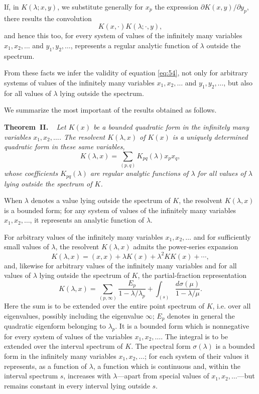 \documentclass[b5paper,twoside]{article}
\makeatletter
\newcommand{\hilbertstatementname}[2]{%
  \textbf{#1\if\relax\detokenize{#2}\relax\else\ #2\fi.}%
}
\newenvironment{theorem}[1][]{%
  \par\addvspace{.7\baselineskip}%
  \phantomsection
  \protected@edef\@currentlabel{#1}%
  \noindent\hilbertstatementname{Theorem}{#1}\ \itshape\ignorespaces
}{%
  \par\addvspace{.7\baselineskip}%
}
\newcommand{\originalpage}[1]{\phantomsection\label{origpage:#1}}
\makeatother
\begin{document}
If, in $K(\lambda;x,y)$, we substitute generally for $x_p$ the expression
$\partial K(x,y)/\partial y_p$, there results the convolution
\[
  K(x,\mathord{\cdot})K(\lambda;\mathord{\cdot},y),
\]
and hence this too, for every system of values of the infinitely many
variables $x_1,x_2,\ldots$ and $y_1,y_2,\ldots$, represents a regular analytic
function of $\lambda$ outside the spectrum.

From these facts we infer the validity of equation \eqref{eq:54}, not only
for arbitrary systems of values of the infinitely many variables
$x_1,x_2,\ldots$ and $y_1,y_2,\ldots$, but also for all values of $\lambda$
lying outside the spectrum.

We summarize the most important of the results obtained as follows.

\begin{theorem}[II]\label{thm:II}
Let $K(x)$ be a bounded quadratic form in the infinitely many variables
$x_1,x_2,\ldots$.  The resolvent $K(\lambda,x)$ of $K(x)$ is a uniquely
determined quadratic form in these same variables,
\[
  K(\lambda,x)=\sum_{(p,q)}K_{pq}(\lambda)x_p x_q,
\]
whose coefficients $K_{pq}(\lambda)$ are regular analytic functions of
$\lambda$ for all values of $\lambda$ lying outside the spectrum of $K$.

When $\lambda$ denotes a value lying outside the spectrum of $K$, the
resolvent $K(\lambda,x)$ is a bounded form; for any system of
values of the infinitely many variables $x_1,x_2,\ldots$, it represents an
analytic function of $\lambda$.

For arbitrary values of the infinitely many variables $x_1,x_2,\ldots$ and
for sufficiently small values of $\lambda$, the resolvent $K(\lambda,x)$
admits the power-series expansion
\begin{equation}
\tag{59}\label{eq:59}
  K(\lambda,x)=(x,x)+\lambda K(x)+\lambda^2KK(x)+\cdots,
\end{equation}
and, likewise for arbitrary values of the infinitely many variables and for
all values of $\lambda$ lying outside the spectrum of $K$, the
partial-fraction representation
\begin{equation}
\tag{60}\label{eq:60}
  K(\lambda,x)
  =\sum_{(p,\infty)}\frac{E_p}{1-\lambda/\lambda_p}
   +\int_{(s)}\frac{d\sigma(\mu)}{1-\lambda/\mu}.
\end{equation}
Here the sum is to be \originalpage{190}extended over the entire point
spectrum of $K$, i.e. over all eigenvalues, possibly including the eigenvalue
$\infty$; $E_p$ denotes in general the quadratic eigenform belonging
to $\lambda_p$.  It is a bounded form which is nonnegative for every system
of values of the variables $x_1,x_2,\ldots$.  The integral is to be extended
over the interval spectrum of $K$.  The spectral form $\sigma(\lambda)$ is a
bounded form in the infinitely many variables $x_1,x_2,\ldots$; for each
system of their values it represents, as a function of $\lambda$, a function
which is continuous and, within the interval spectrum $s$, increases with
$\lambda$---apart from special values of $x_1,x_2,\ldots$---but remains
constant in every interval lying outside $s$.


\end{theorem}
\end{document}
